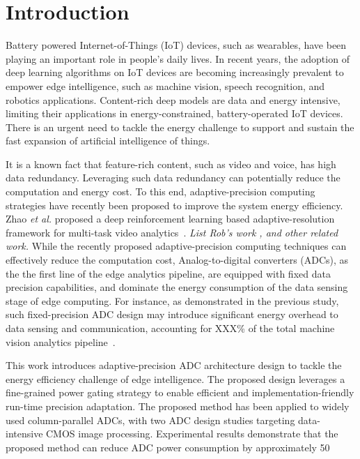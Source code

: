 \section{Introduction}

Battery powered Internet-of-Things (IoT) devices, such as wearables, have been playing an important role in people's daily lives.
In recent years, the adoption of deep learning algorithms on IoT devices are becoming increasingly prevalent to empower edge
intelligence, such as machine vision, speech recognition, and robotics applications. Content-rich deep models are data and energy 
intensive, limiting their applications in energy-constrained, battery-operated IoT devices. There is an urgent need to tackle the 
energy challenge to support and sustain the fast expansion of artificial intelligence of things.

It is a known fact that feature-rich content, such as video and voice, has high data redundancy. Leveraging such data redundancy
can potentially reduce the computation and energy cost. To this end, adaptive-precision computing strategies have recently been 
proposed to improve the system energy efficiency.  Zhao {\it et al.} proposed a deep reinforcement learning based adaptive-resolution 
framework for multi-task video analytics~\cite{XXX}. {\it List Rob's work , and other related work.}
While the recently proposed adaptive-precision computing techniques can effectively reduce the computation cost, Analog-to-digital 
converters (ADCs), as the the first line of the edge analytics pipeline, are equipped with fixed data precision capabilities, and
dominate the energy consumption of the data sensing stage of edge computing. For instance, as demonstrated in the previous study, 
such fixed-precision ADC design may introduce significant energy overhead to data sensing and communication, accounting for XXX\%
of the total machine vision analytics pipeline~\cite{XXX}.

This work introduces adaptive-precision ADC architecture design to tackle the energy efficiency challenge of edge intelligence. 
The proposed design leverages a fine-grained power gating strategy to enable efficient and implementation-friendly run-time precision 
adaptation. The proposed method has been applied to widely used column-parallel ADCs, with two ADC design studies targeting 
data-intensive CMOS image processing. Experimental results demonstrate that the proposed method can reduce ADC power consumption 
by approximately 50%

